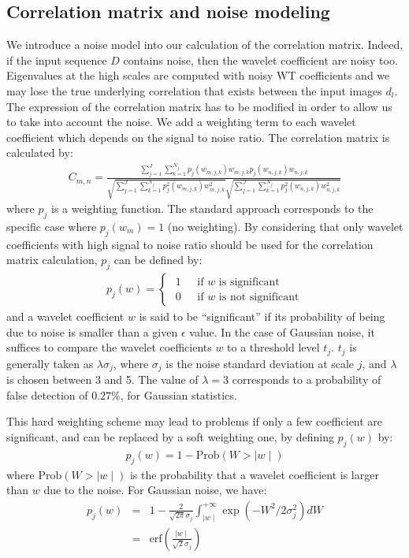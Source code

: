 \subsection{Correlation matrix and noise modeling}
We introduce a noise model into our calculation of the correlation matrix.
Indeed, if the input sequence $D$ contains noise, then the 
wavelet coefficient 
are noisy too. Eigenvalues at the high scales are computed with 
noisy WT coefficients and 
we may lose the true underlying  correlation that exists 
between the input images $d_l$.
The expression of the correlation matrix has to be modified in order 
to allow us to take into account the noise.
We add a weighting term to each wavelet coefficient  which 
depends on the signal to noise ratio.
The correlation matrix is calculated by:
\begin{eqnarray}
C_{m,n} =
 {\frac{ \sum_{j=1}^{J} \sum_{k=1}^{N_j}  p_j(w_{m,j,k}) w_{m,j,k} p_j(w_{n,j,k}) w_{n,j,k}}
                      {\sqrt{  \sum_{j=1}^{J} \sum_{k=1}^{N_j}  p^2_j(w_{m,j,k}) w^2_{m,j,k}} \sqrt{\sum_{j=1}^{J} \sum_{k=1}^{N_j} p^2_j(w_{n,j,k}) w^2_{n,j,k}}}}
\label{Correlation_matrix2}
\end{eqnarray}
where $p_j$ is a weighting function. The standard approach corresponds to the 
specific case where $p_j(w_m) = 1$ (no weighting). By considering that only
wavelet coefficients with high signal to noise ratio should be used for 
the correlation matrix calculation, $p_j$ can be defined by:
\begin{eqnarray}
p_j(w) = \left\{
  \begin{array}{ll}
  \mbox{ 1 } & \mbox{ if }  w \mbox{ is significant} \\
  \mbox{ 0 } & \mbox{ if }  w \mbox{ is not significant}
  \end{array}
  \right.
\end{eqnarray}
and a wavelet coefficient $w$ is said to be ``significant'' 
if its probability of being 
due to noise is smaller than a given $\epsilon$ value. In the case of
Gaussian noise, it suffices to compare  the wavelet coefficients $w$ to
a threshold level $t_j$. $t_j$ is generally taken as $\lambda \sigma_j$, where
$\sigma_j$ is the noise standard deviation at scale $j$, and $\lambda$ is 
chosen
between 3 and 5. The value of $\lambda=3$ corresponds to a probability of 
false
detection of $0.27$\%, for Gaussian statistics.

This hard weighting scheme may lead to problems if only a few coefficient are 
significant, and can be replaced by a soft weighting one, by
defining $p_j(w)$ by:
\begin{eqnarray}
p_j(w) =  1 - \mathrm{Prob}(W > \mid w \mid)   
\end{eqnarray}
where $\mathrm{Prob}(W > \mid w \mid)$ is the probability that a wavelet
coefficient is larger than $w$ due to the noise. For Gaussian noise, we have:
\begin{eqnarray}
   p_j(w)  & =  & 1 - \frac{2}{\sqrt{2 \pi} 
\sigma_j} \int_{\mid w  \mid}^{+\infty} \exp(-W^2/2\sigma^2_j) dW \nonumber \\ 
 & = & \mbox{erf}(\frac{\mid w  \mid }{\sqrt{2}\sigma_j})
\end{eqnarray}

